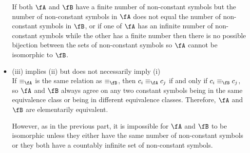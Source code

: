 \begin{Answer}
\begin{itemize}
      \step
      If both $\fA$ and $\fB$ have a finite number of non-constant symbols
      but the number of non-constant symbols in $\fA$ does not equal the
      number of non-constant symbols in $\fB$,
      or if one of $\fA$ has an infinite number of non-constant symbols
      while the other has a finite number then there is no possible bijection
      between the sets of non-constant symbols so $\fA$ cannot be isomorphic
      to $\fB$.
    \item (iii) implies (ii) but does not necessarily imply (i)\\
      If $\equiv_\fA$ is the same relation as $\equiv_\fB$,
      then $c_i \equiv_\fA c_j$ if and only if $c_i \equiv_\fB c_j$,
      so $\fA$ and $\fB$ always agree on any two constant symbols
      being in the same
      equivalence class or being in different equivalence classes.
      Therefore, $\fA$ and $\fB$ are elementarily equivalent.

      However, as in the previous part, it is impossible for $\fA$ and $\fB$
      to be isomorphic unless they either have the same number of non-constant
      symbols or they both have a countably infinite set of non-constant symbols.

  \end{itemize}
\end{Answer}

